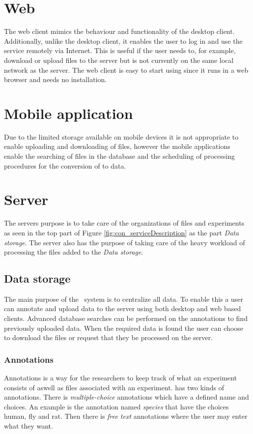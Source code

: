 \section{Web}
The web client mimics the behaviour and functionality of the desktop client. Additionally, unlike the desktop client, it enables the user to log in and use the service remotely via Internet. This is useful if the user needs to, for example, download or upload files to the server but is not currently on the same local network as the server. The web client is easy to start using since it runs in a web browser and needs no installation.

\section{Mobile application}
Due to the limited storage available on mobile devices it is not appropriate to enable uploading and downloading of files, however the mobile applications enable the searching of files in the database and the scheduling of processing procedures for the conversion of  to  data.

\section{Server}
The servers purpose is to take care of the organizations of files and experiments as seen in the top part of Figure \ref{fig:con_serviceDescription} as the part \textit{Data storage}. The server also has the purpose of taking care of the heavy workload of processing the files added to the \textit{Data storage}.

\subsection{Data storage}
The main purpose of the \appName\ system is to centralize all data. To enable this a user can annotate and upload data to the server using both desktop and web based clients.
Advanced database searches can be performed on the annotations to find previously uploaded data. When the required data is found the user can choose to download the files or request that they be processed on the server.

\subsubsection{Annotations}
Annotations is a way for the researchers to keep track of what an experiment consists of aswell as files associated with an experiment.
\appName has two kinds of annotations. There is \textit{multiple-choice} annotations which have a defined name and choices. An example is the annotation named \textit{species} that have the choices human, fly and rat.
Then there is \textit{free text} annotations where the user may enter what they want.

